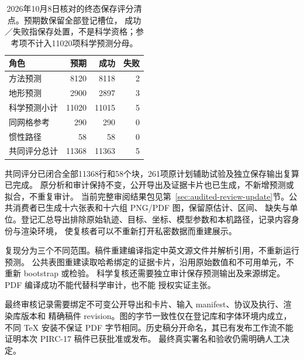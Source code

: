 \documentclass[UTF8,11pt]{ctexart}
\begin{document}
\begin{table}[htbp]\centering\small
\caption{2026年10月8日核对的终态保存评分清点。预期数保留全部登记槽位，
成功／失败指保存处置，不是科学资格；参考项不计入11020项科学预测分母。}
\label{tab:terminal-score-inventory}
\begin{tabular}{@{}lrrr@{}}\toprule
角色 & 预期 & 成功 & 失败\\\midrule
方法预测 & 8120 & 8118 & 2\\
地形预测 & 2900 & 2897 & 3\\
科学预测小计 & 11020 & 11015 & 5\\
同网格参考 & 290 & 290 & 0\\
惯性路径 & 58 & 58 & 0\\
共同评分总计 & 11368 & 11363 & 5\\
\bottomrule\end{tabular}\end{table}

共同评分已闭合全部11368行和58个块，261项原计划辅助试验及独立保存输出复算已完成。
原分析和审计保持不变，公开导出及证据卡片也已生成，不新增预测或拟合，不重复审计。
当前完整审阅结果包见第~\ref{sec:audited-review-update}节。公共消费者已生成十六张表和十六组 PNG/PDF 图，保留原估计、区间、
缺失与单位。登记汇总导出排除原始轨迹、目标、坐标、模型参数和本机路径，记录内容身份与渲染环境，
使复核者可以不重新打开私密数据而重建展示。

复现分为三个不同范围。稿件重建编译指定中英文源文件并解析引用，不重新运行预测。
公共表图重建读取哈希绑定的证据卡片，沿用原始数值和不可用单元，不重新 bootstrap 或检验。
科学复核还需要独立审计保存预测输出及来源绑定。PDF 编译成功不能代替科学审计，也不能
授权实证主张。

最终审核记录需要绑定不可变公开导出和卡片、输入 manifest、协议及执行、渲染库版本和
精确稿件 revision。图的字节一致性仅在登记库和字体环境内成立，不同 TeX 安装不保证
PDF 字节相同。历史稿分开命名，其已有发布工作流不能证明本次 PIRC-17 稿件已获批准或发布。
最终真实署名和验收仍需明确人工决定。
\end{document}
